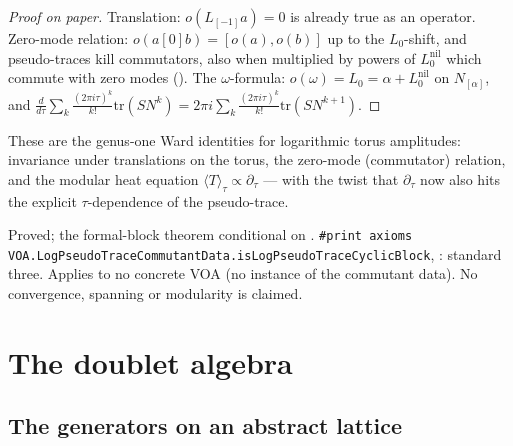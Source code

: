 \begin{proof}[Proof on paper]
Translation: $o(L_{[-1]}a)=0$ is already true as an operator. Zero-mode relation: $o(a[0]b)=[o(a),o(b)]$ up to the
$L_0$-shift, and pseudo-traces kill commutators, also when multiplied by powers of $L_0^{\mathrm{nil}}$ which commute with
zero modes (). The $\omega$-formula: $o(\omega)=L_0=\alpha+L_0^{\mathrm{nil}}$ on $N_{[\alpha]}$,
and $\frac d{d\tau}\sum_k\frac{(2\pi i\tau)^k}{k!}\mathrm{tr}(SN^k)=2\pi i\sum_k\frac{(2\pi i\tau)^{k}}{k!}\mathrm{tr}(SN^{k+1})$.
\end{proof}
\begin{physics}
These are the genus-one Ward identities for logarithmic torus amplitudes: invariance under translations on the
torus, the zero-mode (commutator) relation, and the modular heat equation $\langle T\rangle_\tau\propto\partial_\tau$ --- with the
twist that $\partial_\tau$ now also hits the explicit $\tau$-dependence of the pseudo-trace.
\end{physics}
\begin{status}
Proved; the formal-block theorem conditional on . \texttt{\#print axioms
VOA.LogPseudoTraceCommutantData.isLogPseudoTraceCyclicBlock}, : standard three.
Applies to no concrete VOA (no instance of the commutant data). No convergence, spanning or modularity is
claimed.
\end{status}

\section{The doublet algebra}\label{l18:sec:doublet}

\subsection{The generators on an abstract lattice}

